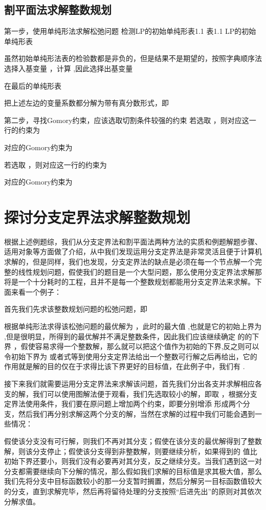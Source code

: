 \subsection{割平面法求解整数规划}

第一步，使用单纯形法求解松弛问题
检测LP的初始单纯形表1.1
表1.1  LP的初始单纯形表
 
 虽然初始单纯形法表的检验数都是非负的，但是结果不是期望的，按照字典顺序法选择入基变量 ，计算 ,因此选择出基变量 
 

在最后的单纯形表
 
把上述左边的变量系数都分解为带有真分数形式，即
 
第二步，寻找Gomory约束，应该选取切割条件较强的约束
若选取 ，则对应这一行的约束为
 
对应的Gomory约束为          
 
若选取 ，则对应这一行的约束为
 
对应的Gomory约束为


\section{探讨分支定界法求解整数规划}

根据上述例题综，我们从分支定界法和割平面法两种方法的实质和例题解题步骤、适用对象等方面做了介绍，从中我们发现运用分支定界法是非常灵活且便于计算机求解的，但是同样，我们也发现，分支定界法的缺点是必须在每一个节点解一个完整的线性规划问题，假使我们的题目是一个大型问题，那么使用分支定界法求解那将是一个十分耗时的工程，且并不是每一个整数规划都能用分支定界法来求解。下面来看一个例子：
  
首先我们先求该整数规划问题的松弛问题，即
 
根据单纯形法求得该松弛问题的最优解为  ，此时的最大值  ,也就是它的初始上界为  ,但是很明显，所得到的最优解并不满足整数条件，因此我们应该继续确定 的的下界 ，假使容易求得一个整数解，那么就可以把这个值作为初始的下界,反之则可以令初始下界为  或者式等到使用分支定界法给出一个整数可行解之后再给出，它的作用就是解的目的仅在于求得比该下界更好的目标值，在此例子中，我们有  .

接下来我们就需要运用分支定界法来求解该问题，首先我们分出各支并求解相应各支的解，我们可以使用图解法便于观看，我们先选取较小的解，即取 ，根据分支定界法使用条件，我们要在原问题上增加两个约束，即要分别增添  形成两个分支，然后我们再分别求解这两个分支的解，当然在求解的过程中我们可能会遇到一些情况：

假使该分支没有可行解，则我们不再对其分支；假使在该分支的最优解得到了整数解，则该分支停止；假使该分支得到非整数解，则要继续分析，如果得到的 值比初始下界还要小，则我们没有必要再对其分支，反之继续分支。当我们遇到这一对分支都需要继续向下分解的情况，那么假如我们求解的目标值是求其极大值，那么我们先将分支中目标函数较小的那一分支暂时搁置，然后分解另一目标函数值较大的分支，直到求解完毕，然后再将留待处理的分支按照“后进先出”的原则对其依次分解求值。

